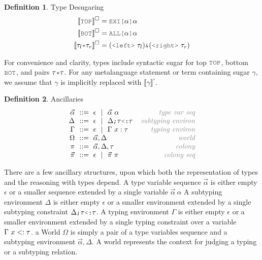 \documentclass[acmsmall]{acmart}
\theoremstyle{definition}
\newtheorem{definition}{Definition}[section]
\begin{document}
\begin{definition} 
  \label{def:type_desugaring}
  Type Desugaring 
  \hfill 
  \boxed{\llbracket \gamma \rrbracket^\square = \tau}
  \\
  \begin{align*}
    \llbracket \J{TOP} \rrbracket^\square &= \J{EXI[} \alpha \J{]} \alpha
    \\
    \llbracket \J{BOT} \rrbracket^\square &= \J{ALL[} \alpha \J{]} \alpha
    \\
    \llbracket \tau_l \J{*} \tau_r \rrbracket^\square &= (\J{<left>}\ \tau_l)  \J{\&} (\J{<right>}\ \tau_r)
  \end{align*}
\end{definition} 

\noindent
For convenience and clarity, types include syntactic sugar for top $\J{TOP}$, 
bottom $\J{BOT}$, and pairs $\tau \J{*} \tau$.
For any metalanguage statement or term containing sugar $\gamma$, we assume that $\gamma$ is implicitly replaced with $\llbracket \gamma \rrbracket^\square$.


\begin{definition} Ancillaries 
  \label{def:type_ancillaries}
  \[\begin{array}[t]{r@{}l@{}r}
    \nonterm{\vec{\alpha}} & \is \epsilon \sep \vec{\alpha}\ \alpha 
    & \com{type var seq}
    \\
    \nonterm{\Delta} & \is \epsilon \sep \Delta \J{;} \tau \J{<:} \tau
    & \com{subtyping environ}
    \\
    \nonterm{\Gamma} & \is \epsilon \sep \Gamma\ x \hastype \tau
    & \com{typing environ}
    \\
    \nonterm{\Omega} & \is \vec{\alpha},\Delta 
    & \com{world}
    \\
    \nonterm{\pi} & \is \vec{\alpha},\Delta,\tau
    & \com{colony}
    \\
    \nonterm{\vec{\pi}} & \is \epsilon \sep \vec{\pi}\ \pi 
    & \com{colony seq}
  \end{array}\]
\end{definition}


There are a few ancillary structures, upon which both the representation of types and the reasoning with types depend.
A type variable sequence $\vec{\alpha}$ is either empty $\epsilon$ or a smaller sequence extended by a single variable $\vec{\alpha}\ \alpha$
A subtyping environment $\Delta$ is either empty $\epsilon$ or a smaller environment extended by a single
subtyping constraint $\Delta \J{;} \tau \J{<:} \tau$.
A typing environment $\Gamma$ is either empty $\epsilon$ or a smaller environment extended by a single
typing constraint over a variable $\Gamma\ x <: \tau$.
a World $\Omega$ is simply a pair of a type variables sequence and a subtyping environment $\vec{\alpha}, \Delta$.
A world represents the context for judging a typing or a subtyping relation.
\end{document}
